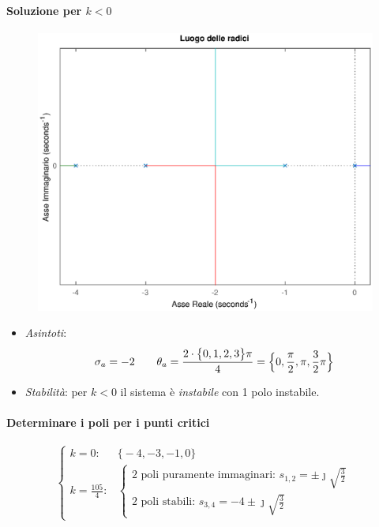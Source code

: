 \begin{esercizio}
\paragraph{Soluzione per \(k < 0\)}

\begin{figure}[ht]
	\centering
	\includegraphics[scale=.6]{mod1/assets/rl_ex38n}
\end{figure}

\begin{itemize}
	\item \emph{Asintoti}:
		\[
			\sigma_a = -2 \qquad \theta_a = \frac{2\cdot\bigl\{ 0,1,2,3 \bigr\}\pi}{4} = \Bigl\{ 0,\frac{\pi}{2},\pi,\frac{3}{2}\pi \Bigr\}
		\]
	\item \emph{Stabilità}: per \(k < 0\) il sistema è \emph{instabile} con 1 polo instabile.
\end{itemize}

\paragraph{Determinare i poli per i punti critici}
\[\begin{cases}
	k = 0\colon & \bigl\{ -4,-3,-1,0 \bigr\} \\
	k = \frac{105}{4}\colon & \begin{cases}
		\text{2 poli puramente immaginari: } s_{1,2} = \pm\jmath\sqrt{\frac{3}{2}} \\
		\text{2 poli stabili: } s_{3,4} = -4 \pm\jmath\sqrt{\frac{3}{2}}
	\end{cases}
\end{cases}\]
\end{esercizio}

